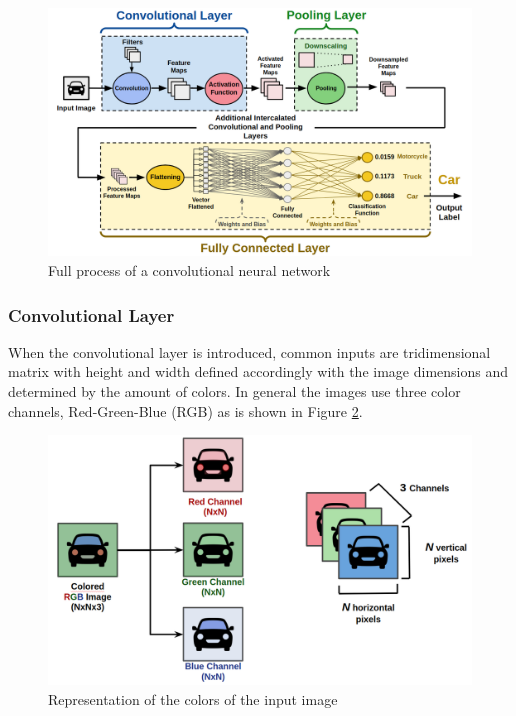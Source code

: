 \begin{figure}[H]
\centering
\includegraphics[width=\columnwidth]{imagens/Full_Process.png}
\caption{Full process of a convolutional neural network}
\label{fig:cnn_car}
\end{figure}


\subsubsection{Convolutional Layer}
\label{sub:conv}

When the convolutional layer is introduced, common inputs are tridimensional matrix with height and width defined accordingly with the image dimensions and determined by the amount of colors. In general the images use three color channels, Red-Green-Blue (RGB) as is shown in Figure \ref{fig:rgb}.

\begin{figure}[H]
\centering
\includegraphics[scale=0.35]{imagens/rgb_representation.png}
\caption{Representation of the colors of the input image}
\label{fig:rgb}
\end{figure}


